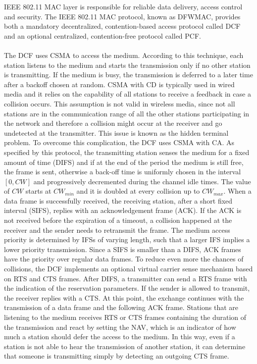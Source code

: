 IEEE 802.11 MAC layer is responsible for reliable data delivery, access control and security. The IEEE 802.11 MAC protocol, known as \gls{DFWMAC}, provides both a mandatory decentralized, contention-based access protocol called \gls{DCF} and an optional centralized, contention-free protocol called \gls{PCF}. \\\\
The \gls{DCF} uses \gls{CSMA} to access the medium. According to this technique, each station listens to the medium and starts the transmission only if no other station is transmitting. If the medium is busy, the transmission is deferred to a later time after a backoff chosen at random. \gls{CSMA} with \gls{CD} is typically used in wired media and it relies on the capability of all stations to receive a feedback in case a collision occurs. This assumption is not valid in wireless media, since not all stations are in the communication range of all the other stations participating in the network and therefore a collision might occur at the receiver and go undetected at the transmitter. This issue is known as the hidden terminal problem. To overcome this complication, the \gls{DCF} uses \gls{CSMA} with \gls{CA}. As specified by this protocol, the transmitting station senses the medium for a fixed amount of time (\gls{DIFS}) and if at the end of the period the medium is still free, the frame is sent, otherwise a back-off time is uniformly chosen in the interval $[0, CW]$ and progressively decremented during the channel idle times. The value of $CW$ starts at $CW_{min}$ and it is doubled at every collision up to $CW_{max}$. When a data frame is successfully received, the receiving station, after a short fixed interval (\gls{SIFS}), replies with an acknowledgement frame (ACK). If the ACK is not received before the expiration of a timeout, a collision happened at the receiver and the sender needs to retransmit the frame. The medium access priority is determined by \glspl{IFS} of varying length, such that a larger \gls{IFS} implies a lower priority transmission. Since a \gls{SIFS} is smaller than a \gls{DIFS}, ACK frames have the priority over regular data frames. To reduce even more the chances of collisions, the \gls{DCF} implements an optional virtual carrier sense mechanism based on \gls{RTS} and \gls{CTS} frames. After \gls{DIFS}, a transmitter can send a \gls{RTS} frame with the indication of the reservation parameters. If the sender is allowed to transmit, the receiver replies with a \gls{CTS}. At this point, the exchange continues with the transmission of a data frame and the following ACK frame. Stations that are listening to the medium receives \gls{RTS} or \gls{CTS} frames containing the duration of the transmission and react by setting the \gls{NAV}, which is an indicator of how much a station should defer the access to the medium. In this way, even if a station is not able to hear the transmission of another station, it can determine that someone is transmitting simply by detecting an outgoing \gls{CTS} frame. \\\\
